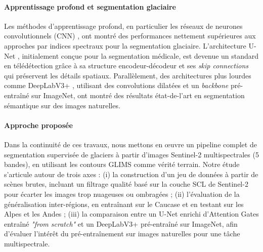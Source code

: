 \paragraph{Apprentissage profond et segmentation glaciaire}
Les méthodes d'apprentissage profond, en particulier les réseaux
de neurones convolutionnels (CNN) \citep{lecun1998gradient}, ont
montré des performances nettement supérieures aux approches par
indices spectraux pour la segmentation glaciaire. L'architecture
U-Net \citep{ronneberger2015unet}, initialement conçue pour la
segmentation médicale, est devenue un standard en télédétection
grâce à sa structure encodeur-décodeur et ses \emph{skip connections}
qui préservent les détails spatiaux. Parallèlement, des
architectures plus lourdes comme DeepLabV3+
\citep{DeepLabV3Plus2018}, utilisant des convolutions dilatées
et un \emph{backbone} pré-entraîné sur ImageNet, ont montré des résultats
état-de-l'art en segmentation sémantique sur des images naturelles.

\paragraph{Approche proposée}
Dans la continuité de ces travaux, nous mettons en œuvre un
pipeline complet de segmentation supervisée de glaciers à partir
d'images Sentinel-2 multispectrales (5 bandes), en utilisant les
contours GLIMS comme vérité terrain. Notre étude s'articule autour
de trois axes : (i) la construction d'un jeu de données à partir
de scènes brutes, incluant un filtrage qualité basé sur la couche
SCL de Sentinel-2 pour écarter les images trop nuageuses ou
ombragées ; (ii) l'évaluation de la généralisation inter-régions,
en entraînant sur le Caucase et en testant sur les Alpes et les
Andes ; (iii) la comparaison entre un U-Net enrichi d'Attention
Gates \citep{AttentionGates2018} entraîné \emph{"from scratch"}
et un DeepLabV3+ pré-entraîné sur ImageNet, afin d'évaluer
l'intérêt du pré-entraînement sur images naturelles pour une
tâche multispectrale.
